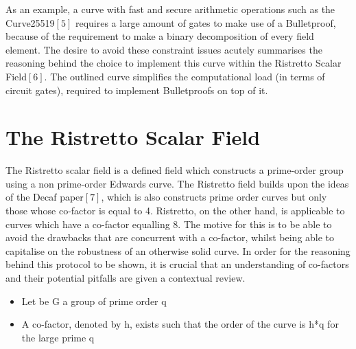 \documentclass[letterpaper, 10 pt, conference]{ieeeconf}  %
\begin{document}
As an example, a curve with fast and secure arithmetic operations such as the Curve25519$[5]$ requires a large amount of gates to make use of a Bulletproof, because of the requirement to make a binary decomposition of every field element. The desire to avoid these constraint issues acutely summarises the reasoning behind the choice to implement this curve within the Ristretto Scalar Field$[6]$. The outlined curve simplifies the computational load (in terms of circuit gates), required to implement Bulletproofs on top of it.


\section{The Ristretto Scalar Field} 

The Ristretto scalar field is a defined field which constructs a prime-order group using a non prime-order Edwards curve. The Ristretto field builds upon the ideas of the Decaf paper$[7]$, which is also constructs prime order curves but only those whose co-factor is equal to 4. Ristretto, on the other hand, is applicable to curves which have a co-factor equalling 8. The motive for this is to be able to avoid the drawbacks that are concurrent with a co-factor, whilst being able to capitalise on the robustness of an otherwise solid curve. In order for the reasoning behind this protocol to be shown, it is crucial that an understanding of co-factors and their potential pitfalls are given a contextual review. \\
\begin{itemize}
    \item Let be G a group of prime order q 
    \item  A co-factor, denoted by h, exists such that the order of the curve is h*q for the large prime q 
\end{itemize} 
\hfill \break
\end{document}
